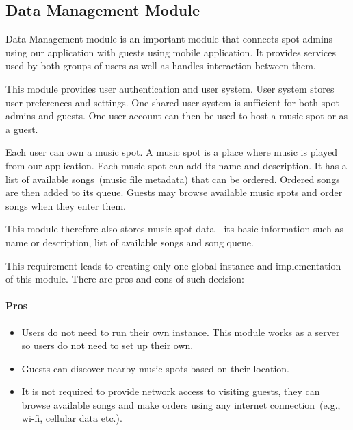 \subsection{Data Management Module}

Data Management module is an important module that connects spot admins using our application with guests using mobile application. It provides services used by both groups of users as well as handles interaction between them.
\par
This module provides user authentication and user system. User system stores user preferences and settings. One shared user system is sufficient for both spot admins and guests. One user account can then be used to host a music spot or as a guest.
\par
Each user can own a music spot. A music spot is a place where music is played from our application. Each music spot can add its name and description. It has a list of available songs~(music file metadata) that can be ordered. Ordered songs are then added to its queue. Guests may browse available music spots and order songs when they enter them.
\par
This module therefore also stores music spot data - its basic information such as name or description, list of available songs and song queue.
\par
 This requirement leads to creating only one global instance and implementation of this module. There are pros and cons of such decision:
\paragraph{Pros}
\begin{itemize}
\item Users do not need to run their own instance. This module works as a server so users do not need to set up their own.
\item Guests can discover nearby music spots based on their location.
\item It is not required to provide network access to visiting guests, they can browse available songs and make orders using any internet connection~(e.g., wi-fi, cellular data etc.).
\end{itemize}

